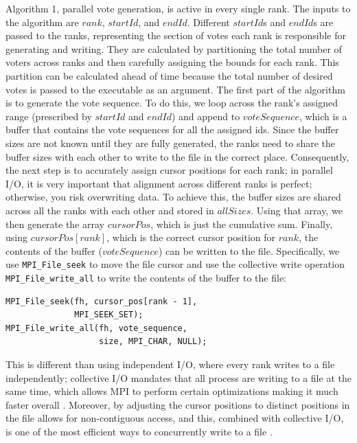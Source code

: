 \documentclass[final,5p,times,twocolumn,authoryear, 10pt]{elsarticle}
\newcommand{\C}[1]{\lstinline{#1}}
\begin{document}
Algorithm 1, parallel vote generation, is active in every single rank. The
inputs to the algorithm are $rank$, $startId$, and $endId$. Different
$startId$s and $endId$s are passed to the ranks, representing the section of
votes each rank is responsible for generating and writing. They are calculated
by partitioning the total number of voters across ranks and then carefully
assigning the bounds for each rank. This partition can be calculated ahead of
time because the total number of desired votes is passed to the executable as
an argument. The first part of the algorithm is to generate the vote sequence.
To do this, we loop across the rank's assigned range (prescribed by $startId$
and $endId$) and append to $voteSequence$, which is a buffer that contains the
vote sequences for all the assigned ids. Since the buffer sizes are not known
until they are fully generated, the ranks need to share the buffer sizes with
each other to write to the file in the correct place. Consequently, the next
step is to accurately assign cursor positions for each rank; in parallel I/O,
it is very important that alignment across different ranks is perfect;
otherwise, you risk overwriting data. To achieve this, the buffer sizes are
shared across all the ranks with each other and stored in $allSizes$. Using
that array, we then generate the array $cursorPos$, which is just the
cumulative sum. Finally, using $cursorPos[rank]$, which is the correct cursor
position for $rank$, the contents of the buffer ($voteSequence$) can be written
to the file. Specifically, we use \C{MPI_File_seek} to move the file cursor and
use the collective write operation \C{MPI_File_write_all} to write the contents
of the buffer to the file:
\begin{center}
    \begin{BVerbatim}
MPI_File_seek(fh, cursor_pos[rank - 1], 
              MPI_SEEK_SET);
MPI_File_write_all(fh, vote_sequence, 
                   size, MPI_CHAR, NULL);
    \end{BVerbatim}
\end{center}
This is different than using independent I/O, where every rank writes to a file
independently; collective I/O mandates that all process are writing to a file
at the same time, which allows MPI to perform certain optimizations making it
much faster overall \cite{pacheco}. Moreover, by adjusting the cursor positions
to distinct positions in the file allows for non-contiguous access, and this,
combined with collective I/O, is one of the most efficient ways to concurrently
write to a file \cite{ching}.
\end{document}
